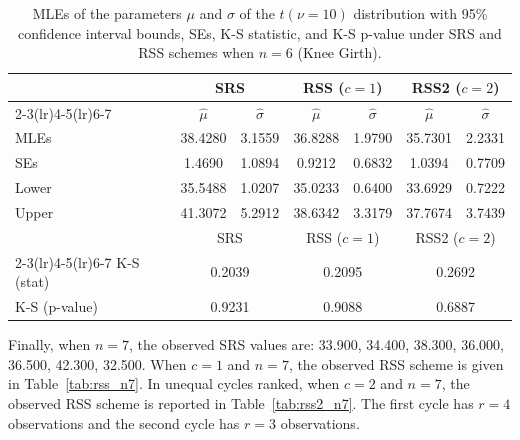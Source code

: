 \documentclass[12pt, a4paper]{article}
\begin{document}
\begin{table}[H]
  \centering
  \caption{MLEs of the parameters $\mu$ and $\sigma$ of the
           $t(\nu=10)$ distribution with 95\% confidence interval bounds,
           SEs, K-S statistic, and K-S p-value under SRS and RSS schemes
           when $n = 6$ (Knee Girth).}
  \label{tab:mle_n6}
  \setlength{\tabcolsep}{6pt}
  \begin{tabular}{lcccccc}
    \toprule
    & \multicolumn{2}{c}{SRS}
    & \multicolumn{2}{c}{RSS ($c = 1$)}
    & \multicolumn{2}{c}{RSS2 ($c = 2$)} \\
    \cmidrule(lr){2-3}\cmidrule(lr){4-5}\cmidrule(lr){6-7}
    & $\hat{\mu}$ & $\hat{\sigma}$
    & $\hat{\mu}$ & $\hat{\sigma}$
    & $\hat{\mu}$ & $\hat{\sigma}$ \\
    \midrule
    MLEs   & 38.4280 & 3.1559 & 36.8288 & 1.9790 & 35.7301 & 2.2331 \\
    SEs    &  1.4690 & 1.0894 &  0.9212 & 0.6832 &  1.0394 & 0.7709 \\
    Lower  & 35.5488 & 1.0207 & 35.0233 & 0.6400 & 33.6929 & 0.7222 \\
    Upper  & 41.3072 & 5.2912 & 38.6342 & 3.3179 & 37.7674 & 3.7439 \\
    \midrule
    & \multicolumn{2}{c}{SRS}
    & \multicolumn{2}{c}{RSS ($c = 1$)}
    & \multicolumn{2}{c}{RSS2 ($c = 2$)} \\
    \cmidrule(lr){2-3}\cmidrule(lr){4-5}\cmidrule(lr){6-7}
    K-S (stat)    & \multicolumn{2}{c}{0.2039}
                  & \multicolumn{2}{c}{0.2095}
                  & \multicolumn{2}{c}{0.2692} \\
    K-S (p-value) & \multicolumn{2}{c}{0.9231}
                  & \multicolumn{2}{c}{0.9088}
                  & \multicolumn{2}{c}{0.6887} \\
    \bottomrule
  \end{tabular}
\end{table}



Finally, when $n = 7$, the observed SRS values are:
33.900, 34.400, 38.300, 36.000, 36.500, 42.300, 32.500.
When $c = 1$ and $n = 7$, the observed RSS scheme is given in
Table~\ref{tab:rss_n7}. In unequal cycles ranked, when $c = 2$ and
$n = 7$, the observed RSS scheme is reported in Table~\ref{tab:rss2_n7}.
The first cycle has $r = 4$ observations and the second cycle has
$r = 3$ observations.
\end{document}
